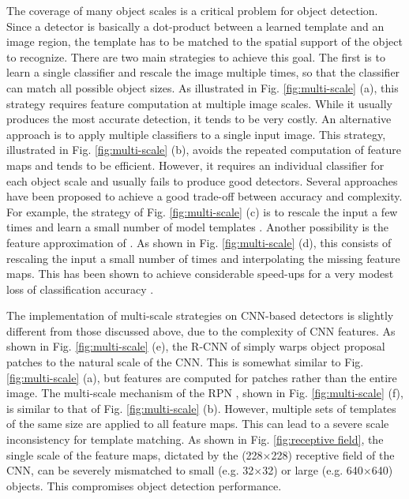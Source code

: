 \documentclass[runningheads]{llncs}
\begin{document}
The coverage of many object scales is a critical problem for object
detection. Since a detector is basically a dot-product between a learned
template and an image region, the template has to be matched to the
spatial support of the object to recognize. There are two main strategies
to achieve this goal. The first is to learn a single classifier and
rescale the image multiple times, so that the classifier can match all
possible object sizes. As illustrated in Fig. \ref{fig:multi-scale} (a),
this strategy requires feature computation at multiple image scales.
While it usually produces the most accurate detection, it tends to
be very costly. An alternative approach is to apply multiple classifiers
to a single input image. This strategy, illustrated in
Fig. \ref{fig:multi-scale} (b), avoids the repeated computation of feature
maps and tends to be efficient. However, it requires an individual classifier
for each object scale and usually fails to produce good detectors.
Several approaches have been proposed to achieve a good trade-off between
accuracy and complexity. For example, the strategy of
Fig. \ref{fig:multi-scale} (c) is to rescale the input a few times and learn
a small number of model templates \cite{DBLP:conf/cvpr/BenensonMTG12}. Another
possibility is the feature approximation
of \cite{DBLP:journals/pami/DollarABP14}. As shown in
Fig. \ref{fig:multi-scale} (d), this consists of rescaling the input a small
number of times and interpolating the missing feature maps. This
has been shown to achieve considerable speed-ups for a very modest loss of
classification accuracy \cite{DBLP:journals/pami/DollarABP14}.

The implementation of multi-scale strategies on CNN-based detectors is
slightly different from those discussed above, due to the complexity of CNN
features. As shown in Fig. \ref{fig:multi-scale} (e), the R-CNN of
\cite{DBLP:conf/cvpr/GirshickDDM14} simply warps object proposal patches to
the natural scale of the CNN. This is somewhat similar to Fig.
\ref{fig:multi-scale} (a), but features are computed for patches rather
than the entire image. The multi-scale mechanism of the
RPN \cite{DBLP:conf/nips/shaoqing15fasterRcnn}, shown in
Fig. \ref{fig:multi-scale} (f), is similar to that of
Fig. \ref{fig:multi-scale} (b). However, multiple sets of templates of the
same size are applied to all feature maps. This can lead to a
severe scale inconsistency for template matching. As shown
in Fig. \ref{fig:receptive field}, the single scale of the feature maps,
dictated by the (228$\times$228) receptive field of the CNN, can be
severely mismatched to small (e.g. 32$\times$32) or large
(e.g. 640$\times$640) objects. This compromises object detection
performance.
\end{document}

